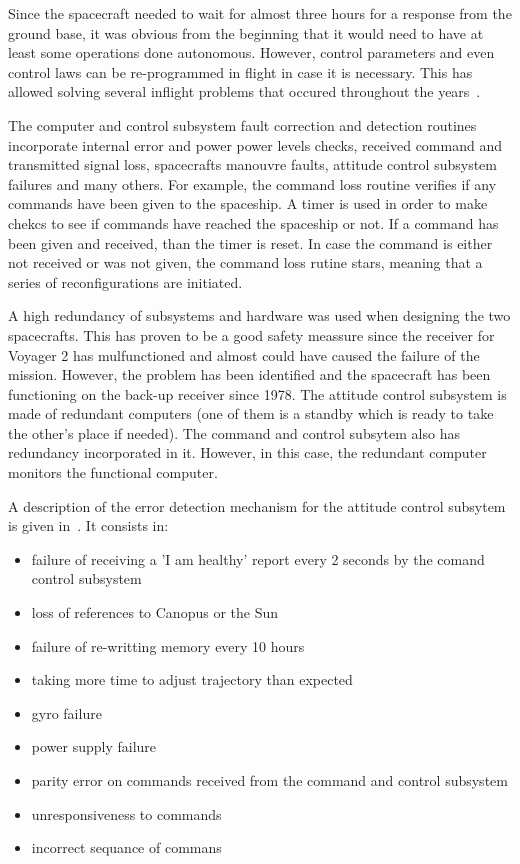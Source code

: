 Since the spacecraft needed to wait for almost three hours for a response from
the ground base, it was obvious from the beginning that it would need to have at
least some operations done autonomous. However, control parameters and even
control laws can be re-programmed in flight in case it is necessary. This has
allowed solving several inflight problems that occured throughout the
years~\cite{litty}.

The computer and control subsystem fault correction and detection routines
incorporate internal error and power power levels checks, received command and
transmitted signal loss, spacecrafts manouvre faults, attitude control subsystem
failures and many others. For example, the command loss routine verifies if any
commands have been given to the spaceship. A timer is used in order to make
chekcs to see if commands have reached the spaceship or not. If a command has
been given and received, than the timer is reset. In case the command is either
not received or was not given, the command loss rutine stars, meaning that a
series of reconfigurations are initiated.

A high redundancy of subsystems and hardware was used when designing the two
spacecrafts. This has proven to be a good safety meassure since the receiver for
Voyager 2 has mulfunctioned and almost could have caused the failure of the
mission. However, the problem has been identified and the spacecraft has been
functioning on the back-up receiver since 1978. The attitude control subsystem
is made of redundant computers (one of them is a standby which is ready to take
the other's place if needed). The command and control subsytem also has
redundancy incorporated in it. However, in this case, the redundant computer
monitors the functional computer.

A description of the error detection mechanism for the attitude control subsytem
is given in~\cite{ft-space-avionics}. It consists in:
\begin{itemize}
  \item failure of receiving a 'I am healthy' report every 2 seconds by the
  comand control subsystem
  \item loss of references to Canopus or the Sun
  \item failure of re-writting memory every 10 hours
  \item taking more time to adjust trajectory than expected
  \item gyro failure
  \item power supply failure
  \item parity error on commands received from the command and control subsystem
  \item unresponsiveness to commands
  \item incorrect sequance of commans
\end{itemize}


